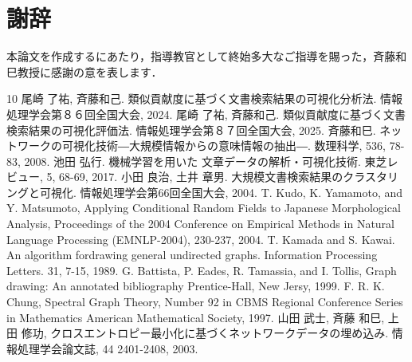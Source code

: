 \documentclass[a4paper,12pt]{jsreport}
\begin{document}
\chapter*{謝辞} 
本論文を作成するにあたり，指導教官として終始多大なご指導を賜った，斉藤和巳教授に感謝の意を表します．

\renewcommand{\bibname}{参考文献}
\begin{thebibliography}{10}
尾崎 了祐, 斉藤和己.
類似貢献度に基づく文書検索結果の可視化分析法.
情報処理学会第８６回全国大会, 2024. 
尾崎 了祐, 斉藤和己.
類似貢献度に基づく文書検索結果の可視化評価法.
情報処理学会第８７回全国大会, 2025. 
斉藤和巳.
ネットワークの可視化技術―大規模情報からの意味情報の抽出―.
数理科学, 536, 78-83, 2008.
池田 弘行.
機械学習を用いた 文章データの解析・可視化技術.
東芝レビュー, 5, 68-69, 2017. 
小田 良治, 土井 章男.
大規模文書検索結果のクラスタリングと可視化.
情報処理学会第66回全国大会, 2004. 
T. Kudo, K. Yamamoto, and Y. Matsumoto, 
Applying Conditional Random Fields to Japanese Morphological Analysis, 
Proceedings of the 2004 Conference on Empirical Methods in Natural Language Processing (EMNLP-2004), 230-237, 2004.
T. Kamada and S. Kawai. 
An algorithm fordrawing general undirected graphs. 
Information Processing Letters. 31, 7-15, 1989.
G. Battista, P. Eades, R. Tamassia, and I. Tollis, 
Graph drawing: An annotated bibliography Prentice-Hall, New Jersy, 1999.
F. R. K. Chung,
Spectral Graph Theory, Number 92 in CBMS Regional Conference Series 
in Mathematics American Mathematical Society, 1997. 
山田 武士, 斉藤 和巳, 上田 修功, クロスエントロピー最小化に基づくネットワークデータの埋め込み.
情報処理学会論文誌, 44 2401-2408, 2003.

\end{thebibliography}
\end{document}
